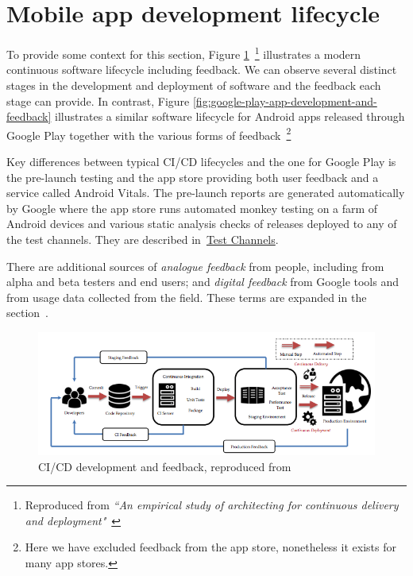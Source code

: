 \section{Mobile app development lifecycle}
To provide some context for this section, Figure \ref{fig:ci-cd-development-and-feedback}~\footnote{Reproduced from \emph{``An empirical study of architecting for continuous delivery and deployment"}~\cite{shahin2019empirical_study_architecting_cd}}
illustrates a modern continuous software lifecycle including feedback. We can observe several distinct stages in the development and deployment of software and the feedback each stage can provide. %
%
In contrast, Figure \ref{fig:google-play-app-development-and-feedback} illustrates a similar software lifecycle for Android apps released through Google Play together with the various forms of feedback~\footnote{Here we have excluded feedback from the app store, nonetheless it exists for many app stores.} 

Key differences between typical CI/CD lifecycles and the one for Google Play is the pre-launch testing and the app store providing both user feedback and a service called Android Vitals. The pre-launch reports are generated automatically by Google where the app store runs automated monkey testing on a farm of Android devices and various static analysis checks of releases deployed to any of the test channels. They are described in~\href{subsection-test-channels}{Test Channels}. %

There are additional sources of \emph{analogue feedback} from people, including from alpha and beta testers and end users; and \emph{digital feedback} from Google tools and from usage data collected from the field. These terms are expanded in the section~\href{analogue-and-digital-feedback}{\emph{}}.


\begin{figure}[ht]
    \centering
    \includegraphics[width=13cm]{images/ci-cd-development-and-feedback.png}
    \caption{CI/CD development and feedback, reproduced from~\cite{shahin2019empirical_study_architecting_cd}}
    \label{fig:ci-cd-development-and-feedback}
\end{figure}


